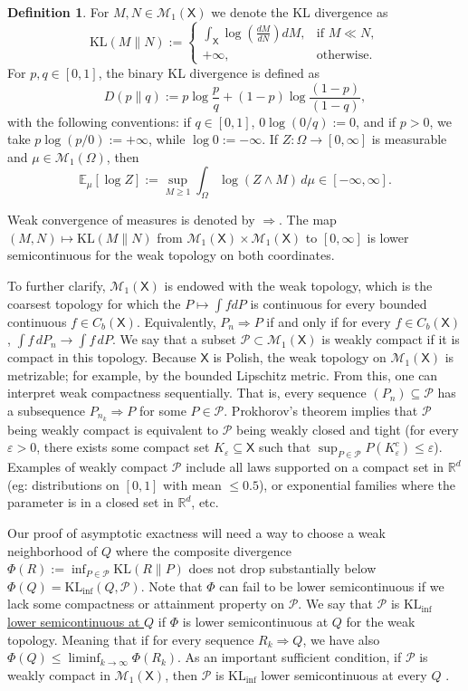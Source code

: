 \documentclass[11pt]{article}
\newcommand{\KL}{\mathrm{KL}}
\newcommand{\KLinf}{\mathrm{KL}_{\mathrm{inf}}}
\newcommand{\E}{\mathbb{E}}
\newcommand{\Pcal}{\mathcal{P}}
\newcommand{\X}{\mathsf{X}}
\theoremstyle{definition}
\newtheorem{definition}[theorem]{Definition}
\theoremstyle{definition}
\begin{document}
\begin{definition}\label{def:kl}
For $M, N\in\mathcal{M}_1(\X)$ we denote the KL divergence as
\[
\KL(M\|N):=
\begin{cases}
\displaystyle \int_\X \log\left(\frac{dM}{dN}\right)dM, &\text{if } M\ll N,\\[0.6em]
+\infty, &\text{otherwise.}   
\end{cases}
\]
For $p,q\in[0,1]$, the binary KL divergence is defined as
\[
D(p\|q):=p\log\frac{p}{q} + (1-p)\log\frac{(1-p)}{(1-q)},
\]
with the following conventions: if $q\in[0,1]$, $0\log (0/q):=0$, 
and if $p>0$, we take $p\log(p/0):=+\infty$, while $\log 0:=-\infty$. If $Z:\Omega\to[0,\infty]$ is measurable and $\mu\in\mathcal M_1(\Omega)$, then
\[
\E_{\mu}[\log Z]:=\sup_{M\ge 1}\int_{\Omega}\log(Z\wedge M)\,d\mu\in[-\infty,\infty].
\]
\end{definition}

\noindent 
Weak convergence of measures is denoted by $\Rightarrow$.  
The map $(M, N)\mapsto\KL(M\|N)$ from $\mathcal{M}_1(\X)\times\mathcal{M}_1(\X)$ to $[0,\infty]$ is lower semicontinuous for the weak topology on both coordinates.

To further clarify,  $\mathcal M_1(\X)$ is endowed with the weak topology, which is the coarsest topology for which the $P\mapsto \int f dP$ is continuous for every bounded continuous $f\in C_b(\X)$. Equivalently, $P_n\Rightarrow P$ if and only if for every $f\in C_b(\X)$,
\(
\int f\,dP_n\to\int f\,dP.
\)
We say that a subset $\Pcal\subset \mathcal M_1(\X)$ is weakly compact if it is compact in this topology. Because $\X$ is Polish, the weak topology on $\mathcal M_1(\X)$ is metrizable; for example, by the bounded Lipschitz metric. From this, one can interpret weak compactness sequentially. That is, every sequence $(P_n)\subseteq\Pcal$ has a subsequence $P_{n_k}\Rightarrow P$ for some $P\in\Pcal$. Prokhorov's theorem implies that $\Pcal$ being weakly compact is equivalent to $\Pcal$ being weakly closed and tight (for every $\varepsilon>0$, there exists some compact set $K_\varepsilon\subseteq \X$ such that $\sup_{P\in\Pcal} P(K_{\varepsilon}^c)\le \varepsilon$). Examples of weakly compact $\Pcal$ include all laws supported on a compact set in $\mathbb R^d$ (eg:  distributions on $[0,1]$ with mean  $\leq 0.5$), or exponential families where the parameter is in a closed set in $\mathbb R^d$, etc. 

Our proof of asymptotic exactness will need a way to choose a weak neighborhood of $Q$ where the composite divergence $\Phi(R):=\inf_{P\in\mathcal P}\KL(R\|P)$ does not drop substantially below $\Phi(Q)=\KLinf(Q,\Pcal)$. Note that $\Phi$ can fail to be lower semicontinuous if we lack some compactness or attainment property on $\Pcal$. 
We say that $\Pcal$ is \underline{$\KLinf$ lower semicontinuous at $Q$} if $\Phi$ is lower semicontinuous at $Q$ for the weak topology. Meaning that if for every sequence $R_k\Rightarrow Q$, we have also $\Phi(Q)\le\liminf_{k\to\infty}\Phi(R_k)$.   
As an important sufficient condition, if $\Pcal$ is weakly compact in $\mathcal{M}_1(\X)$, then $\Pcal$ is $\KLinf$ lower semicontinuous at every $Q$ \cite{ram2026powersequentialtestsexist}. 
\end{document}
